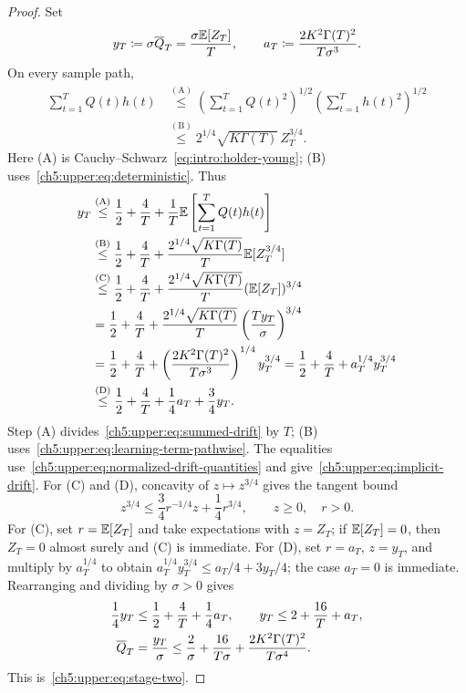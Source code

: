 \begin{proof}
Set
\begin{equation}
 y_T\coloneqq\sigma\overline Q_T=\frac{\sigma\mathbb{E}[Z_T]}{T},
 \qquad
 a_T\coloneqq\frac{2K^2\Gamma(T)^2}{T\sigma^3}.
 \label{ch5:upper:eq:normalized-drift-quantities}
\end{equation}
On every sample path,
\begin{equation}
\begin{aligned}
\sum_{t=1}^{T}Q(t)h(t)
 &\overset{\mathrm{(A)}}{\le}\left(\sum_{t=1}^{T}Q(t)^2\right)^{1/2}
     \left(\sum_{t=1}^{T}h(t)^2\right)^{1/2}\\
 &\overset{\mathrm{(B)}}{\le}2^{1/4}\sqrt{K\Gamma(T)}\,Z_T^{3/4}.
\end{aligned}
\label{ch5:upper:eq:learning-term-pathwise}
\end{equation}
Here (A) is Cauchy--Schwarz~\eqref{eq:intro:holder-young};
(B) uses~\eqref{ch5:upper:eq:deterministic}. Thus
\begin{align*}
y_T
 &\overset{\mathrm{(A)}}{\le}\frac12+\frac4T
   +\frac1T\mathbb{E}\left[\sum_{t=1}^{T}Q(t)h(t)\right]\\
 &\overset{\mathrm{(B)}}{\le}\frac12+\frac4T
   +\frac{2^{1/4}\sqrt{K\Gamma(T)}}{T}\mathbb{E}[Z_T^{3/4}]\\
 &\overset{\mathrm{(C)}}{\le}\frac12+\frac4T
   +\frac{2^{1/4}\sqrt{K\Gamma(T)}}{T}(\mathbb{E}[Z_T])^{3/4}\\
&=\frac12+\frac4T
   +\frac{2^{1/4}\sqrt{K\Gamma(T)}}{T}
       \left(\frac{Ty_T}{\sigma}\right)^{3/4}\\
&=\frac12+\frac4T
   +\left(\frac{2K^2\Gamma(T)^2}{T\sigma^3}\right)^{1/4}
       y_T^{3/4}
 =\frac12+\frac4T+a_T^{1/4}y_T^{3/4}\\
 &\overset{\mathrm{(D)}}{\le}\frac12+\frac4T
    +\frac14a_T+\frac34y_T.
\end{align*}
Step (A) divides~\eqref{ch5:upper:eq:summed-drift} by $T$;
(B) uses~\eqref{ch5:upper:eq:learning-term-pathwise}.
The equalities use~\eqref{ch5:upper:eq:normalized-drift-quantities}
and give~\eqref{ch5:upper:eq:implicit-drift}.
For (C) and (D), concavity of $z\mapsto z^{3/4}$ gives the tangent bound
\[
 z^{3/4}\le\frac34r^{-1/4}z+\frac14r^{3/4},\qquad z\ge0,\quad r>0.
\]
For (C), set $r=\mathbb{E}[Z_T]$ and take expectations with $z=Z_T$;
if $\mathbb{E}[Z_T]=0$, then $Z_T=0$ almost surely and (C) is immediate.
For (D), set $r=a_T$, $z=y_T$, and multiply by $a_T^{1/4}$ to obtain
$a_T^{1/4}y_T^{3/4}\le a_T/4+3y_T/4$; the case $a_T=0$ is immediate.
Rearranging and dividing by $\sigma>0$ gives
\begin{align}
 \frac14y_T&\le\frac12+\frac4T+\frac14a_T,
 \qquad y_T\le2+\frac{16}{T}+a_T,\notag\\
 \overline Q_T&=\frac{y_T}{\sigma}
 \le\frac2\sigma+\frac{16}{T\sigma}
       +\frac{2K^2\Gamma(T)^2}{T\sigma^4}.
 \label{ch5:upper:eq:combination-drift}
\end{align}
This is~\eqref{ch5:upper:eq:stage-two}.
\end{proof}

